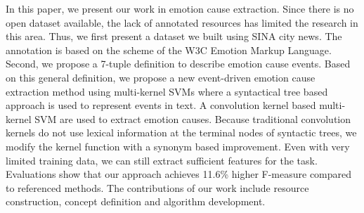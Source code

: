 In this paper, we present our work in emotion cause extraction. Since there is no open dataset available, the lack of annotated resources has limited the research in this area. Thus, we first present a dataset we built using SINA city news. The annotation is based on the scheme of the W3C Emotion Markup Language. Second, we propose a 7-tuple definition to describe emotion cause events. Based on this general definition, we propose a new event-driven emotion cause extraction method using multi-kernel SVMs where a syntactical tree based approach is used to represent events in text. A convolution kernel based multi-kernel SVM are used to extract emotion causes. Because traditional convolution kernels do not use lexical information at the terminal nodes of syntactic trees, we modify the kernel function with a synonym based improvement. Even with very limited training data, we can still extract sufficient features for the task. Evaluations show that our approach achieves 11.6\% higher F-measure compared to referenced methods. The contributions of our work include resource construction, concept definition and algorithm development.

